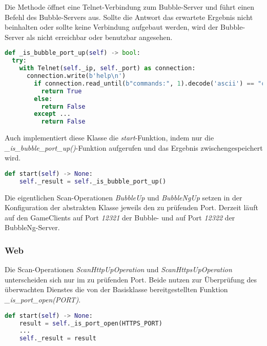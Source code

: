 Die Methode öffnet eine Telnet-Verbindung zum Bubble-Server und führt einen Befehl des Bubble-Servers aus. Sollte die Antwort das erwartete Ergebnis nicht beinhalten oder sollte keine Verbindung aufgebaut werden, wird der Bubble-Server  als nicht erreichbar oder benutzbar angesehen.

\begin{lstlisting}[language=Python, frame=single, caption={Big Brother Buble Port Prüfung}, captionpos=b, label={lst:bigbrother-bubble-up}]
def _is_bubble_port_up(self) -> bool:
  try:
    with Telnet(self._ip, self._port) as connection:
      connection.write(b'help\n')
        if connection.read_until(b"commands:", 1).decode('ascii') == "commands:":
          return True
        else:
          return False
        except ...
          return False
\end{lstlisting} 

Auch implementiert diese Klasse die \textit{start}-Funktion, indem nur die \textit{\_is\_bubble\_port\_up()}-Funktion aufgerufen und das Ergebnis zwischengespeichert wird.
\begin{lstlisting}[language=Python, frame=single, caption={Big Brother Bubble Scan-Operation}, captionpos=b, label={lst:bigbrother-bubble-up-start}]
def start(self) -> None:
	self._result = self._is_bubble_port_up()
\end{lstlisting} 

Die eigentlichen Scan-Operationen \textit{BubbleUp} und \textit{BubbleNgUp} setzen in der Konfiguration der abstrakten Klasse jeweils den zu prüfenden Port. Derzeit läuft auf den GameClients auf Port \textit{12321} der Bubble- und auf Port \textit{12322} der BubbleNg-Server.
\subsubsection{Web}

Die Scan-Operationen \textit{ScanHttpUpOperation} und \textit{ScanHttpsUpOperation} unterscheiden sich nur im zu prüfenden Port. Beide nutzen zur Überprüfung des überwachten Dienstes die von der Basisklasse bereitgestellten Funktion \textit{\_is\_port\_open(PORT)}.

\begin{lstlisting}[language=Python, frame=single, caption={Big Brother HTTP(S) Scan-Operation}, captionpos=b, label={lst:bigbrother-http-up}]
def start(self) -> None:
	result = self._is_port_open(HTTPS_PORT)
	...
	self._result = result
\end{lstlisting} 

